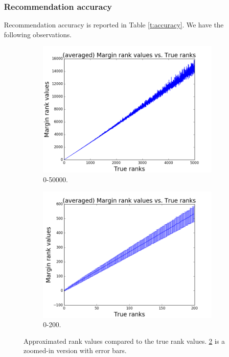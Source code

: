 \documentclass[letterpaper]{article}
\begin{document}
\subsubsection{Recommendation accuracy}

Recommendation accuracy is reported in Table \ref{t:accuracy}. We have the following observations.

\begin{figure}
\centering
\begin{subfigure}{.25\textwidth}
  \centering
  \includegraphics[width=.99\linewidth]{pics/quality.png}
  \caption{0-50000.}
  \label{fig:qual1}
\end{subfigure}%
\begin{subfigure}{.25\textwidth}
  \centering
  \includegraphics[width=.99\linewidth]{pics/quality200.png}
  \caption{0-200.}
  \label{fig:qual2}
\end{subfigure}
\caption{Approximated rank values compared to the true rank values. \ref{fig:qual2} is a zoomed-in version with error bars.}
\label{fig:rankapprox}
\end{figure}
\end{document}
